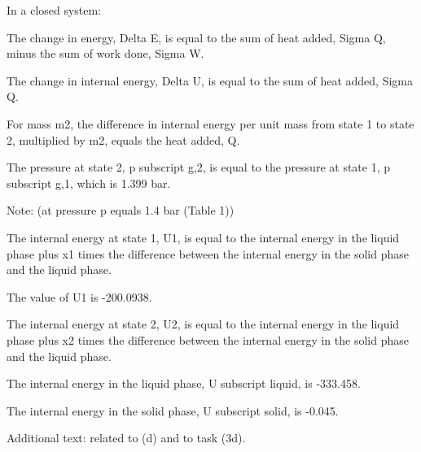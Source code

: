 In a closed system:

The change in energy, Delta E, is equal to the sum of heat added, Sigma Q, minus the sum of work done, Sigma W.

The change in internal energy, Delta U, is equal to the sum of heat added, Sigma Q.

For mass m2, the difference in internal energy per unit mass from state 1 to state 2, multiplied by m2, equals the heat added, Q.

The pressure at state 2, p subscript g,2, is equal to the pressure at state 1, p subscript g,1, which is 1.399 bar.

Note: (at pressure p equals 1.4 bar (Table 1))

The internal energy at state 1, U1, is equal to the internal energy in the liquid phase plus x1 times the difference between the internal energy in the solid phase and the liquid phase.

The value of U1 is -200.0938.

The internal energy at state 2, U2, is equal to the internal energy in the liquid phase plus x2 times the difference between the internal energy in the solid phase and the liquid phase.

The internal energy in the liquid phase, U subscript liquid, is -333.458.

The internal energy in the solid phase, U subscript solid, is -0.045.

Additional text: related to (d) and to task (3d).